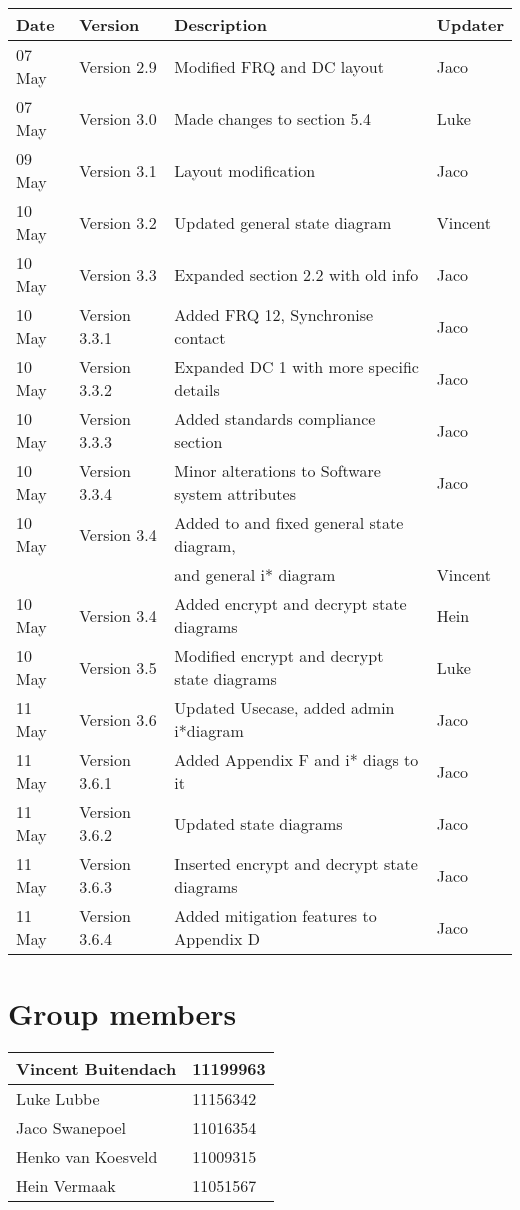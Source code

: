 \begin{center}
\begin{tabular}{|l|l|l|l|}
\hline
\textbf{Date} & \textbf{Version} & \textbf{Description}&\textbf{Updater}\\ 
\hline
07 May & Version 2.9 & Modified FRQ and DC layout & Jaco\\
\hline
07 May & Version 3.0 & Made changes to section 5.4 & Luke\\
\hline
09 May & Version 3.1 & Layout modification & Jaco\\
\hline
10 May & Version 3.2 & Updated general state diagram & Vincent\\
\hline
10 May & Version 3.3 & Expanded section 2.2 with old info& Jaco\\
\hline
10 May & Version 3.3.1 & Added FRQ 12, Synchronise contact& Jaco\\
\hline
10 May & Version 3.3.2 & Expanded DC 1 with more specific details& Jaco\\
\hline
10 May & Version 3.3.3 & Added standards compliance section& Jaco\\
\hline
10 May & Version 3.3.4 & Minor alterations to Software system attributes& Jaco\\
\hline
10 May & Version 3.4 & Added to and fixed general state diagram,&\\
&& and general i* diagram & Vincent\\
\hline
10 May & Version 3.4 & Added encrypt and decrypt state diagrams & Hein\\
\hline
10 May & Version 3.5 & Modified encrypt and decrypt state diagrams & Luke\\
\hline
11 May & Version 3.6 & Updated Usecase, added admin i*diagram& Jaco\\
\hline
11 May & Version 3.6.1 & Added Appendix F and i* diags to it &Jaco\\
\hline
11 May & Version 3.6.2 & Updated state diagrams &Jaco\\
\hline
11 May & Version 3.6.3 & Inserted encrypt and decrypt state diagrams&Jaco\\
\hline
11 May & Version 3.6.4 & Added mitigation features to Appendix D&Jaco\\
\hline
\end{tabular}

\vfill
\section*{Group members}

\begin{tabular}{|l|l|}

\hline
Vincent Buitendach & 11199963\\
\hline
Luke Lubbe & 11156342\\
\hline
Jaco Swanepoel & 11016354\\
\hline
Henko van Koesveld & 11009315\\
\hline
Hein Vermaak & 11051567\\
\hline

\end{tabular}

\end{center}


